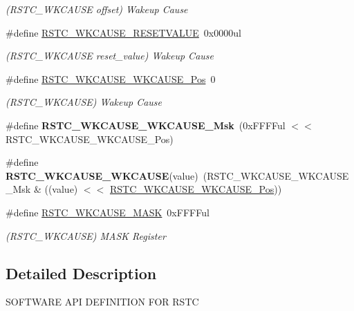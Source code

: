 \begin{DoxyCompactItemize}
\begin{DoxyCompactList}\small\item\em (R\+S\+T\+C\+\_\+\+W\+K\+C\+A\+U\+S\+E offset) Wakeup Cause \end{DoxyCompactList}\item 
\hypertarget{group___s_a_m_l21___r_s_t_c_ga8766df7d7c898c302af29aea85e30751}{}\#define \hyperlink{group___s_a_m_l21___r_s_t_c_ga8766df7d7c898c302af29aea85e30751}{R\+S\+T\+C\+\_\+\+W\+K\+C\+A\+U\+S\+E\+\_\+\+R\+E\+S\+E\+T\+V\+A\+L\+U\+E}~0x0000ul\label{group___s_a_m_l21___r_s_t_c_ga8766df7d7c898c302af29aea85e30751}

\begin{DoxyCompactList}\small\item\em (R\+S\+T\+C\+\_\+\+W\+K\+C\+A\+U\+S\+E reset\+\_\+value) Wakeup Cause \end{DoxyCompactList}\item 
\hypertarget{group___s_a_m_l21___r_s_t_c_ga6819476aeddb77abcd11139b9d219033}{}\#define \hyperlink{group___s_a_m_l21___r_s_t_c_ga6819476aeddb77abcd11139b9d219033}{R\+S\+T\+C\+\_\+\+W\+K\+C\+A\+U\+S\+E\+\_\+\+W\+K\+C\+A\+U\+S\+E\+\_\+\+Pos}~0\label{group___s_a_m_l21___r_s_t_c_ga6819476aeddb77abcd11139b9d219033}

\begin{DoxyCompactList}\small\item\em (R\+S\+T\+C\+\_\+\+W\+K\+C\+A\+U\+S\+E) Wakeup Cause \end{DoxyCompactList}\item 
\hypertarget{group___s_a_m_l21___r_s_t_c_ga0e3127f943696652b7f28b4a632609a6}{}\#define {\bfseries R\+S\+T\+C\+\_\+\+W\+K\+C\+A\+U\+S\+E\+\_\+\+W\+K\+C\+A\+U\+S\+E\+\_\+\+Msk}~(0x\+F\+F\+F\+Ful $<$$<$ R\+S\+T\+C\+\_\+\+W\+K\+C\+A\+U\+S\+E\+\_\+\+W\+K\+C\+A\+U\+S\+E\+\_\+\+Pos)\label{group___s_a_m_l21___r_s_t_c_ga0e3127f943696652b7f28b4a632609a6}

\item 
\hypertarget{group___s_a_m_l21___r_s_t_c_ga1409fc0ce1bd2ba4b71a785f7489014b}{}\#define {\bfseries R\+S\+T\+C\+\_\+\+W\+K\+C\+A\+U\+S\+E\+\_\+\+W\+K\+C\+A\+U\+S\+E}(value)~(R\+S\+T\+C\+\_\+\+W\+K\+C\+A\+U\+S\+E\+\_\+\+W\+K\+C\+A\+U\+S\+E\+\_\+\+Msk \& ((value) $<$$<$ \hyperlink{group___s_a_m_l21___r_s_t_c_ga6819476aeddb77abcd11139b9d219033}{R\+S\+T\+C\+\_\+\+W\+K\+C\+A\+U\+S\+E\+\_\+\+W\+K\+C\+A\+U\+S\+E\+\_\+\+Pos}))\label{group___s_a_m_l21___r_s_t_c_ga1409fc0ce1bd2ba4b71a785f7489014b}

\item 
\hypertarget{group___s_a_m_l21___r_s_t_c_ga7aba6cd90dfcd31031cd41692937cd77}{}\#define \hyperlink{group___s_a_m_l21___r_s_t_c_ga7aba6cd90dfcd31031cd41692937cd77}{R\+S\+T\+C\+\_\+\+W\+K\+C\+A\+U\+S\+E\+\_\+\+M\+A\+S\+K}~0x\+F\+F\+F\+Ful\label{group___s_a_m_l21___r_s_t_c_ga7aba6cd90dfcd31031cd41692937cd77}

\begin{DoxyCompactList}\small\item\em (R\+S\+T\+C\+\_\+\+W\+K\+C\+A\+U\+S\+E) M\+A\+S\+K Register \end{DoxyCompactList}\end{DoxyCompactItemize}


\subsection{Detailed Description}
S\+O\+F\+T\+W\+A\+R\+E A\+P\+I D\+E\+F\+I\+N\+I\+T\+I\+O\+N F\+O\+R R\+S\+T\+C 